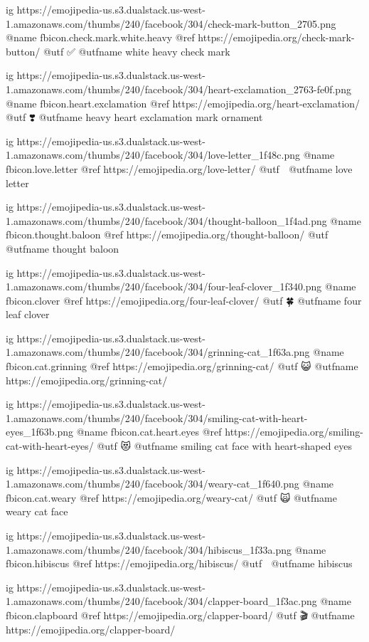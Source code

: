   ig https://emojipedia-us.s3.dualstack.us-west-1.amazonaws.com/thumbs/240/facebook/304/check-mark-button_2705.png
  @name fbicon.check.mark.white.heavy
  @ref https://emojipedia.org/check-mark-button/
  @utf ✅
  @utfname white heavy check mark

  ig https://emojipedia-us.s3.dualstack.us-west-1.amazonaws.com/thumbs/240/facebook/304/heart-exclamation_2763-fe0f.png
  @name fbicon.heart.exclamation
  @ref https://emojipedia.org/heart-exclamation/
  @utf ❣️
  @utfname heavy heart exclamation mark ornament

  ig https://emojipedia-us.s3.dualstack.us-west-1.amazonaws.com/thumbs/240/facebook/304/love-letter_1f48c.png
  @name fbicon.love.letter
  @ref https://emojipedia.org/love-letter/
  @utf 💌
  @utfname love letter

  ig https://emojipedia-us.s3.dualstack.us-west-1.amazonaws.com/thumbs/240/facebook/304/thought-balloon_1f4ad.png
  @name fbicon.thought.baloon
  @ref https://emojipedia.org/thought-balloon/
  @utf 💭
  @utfname thought baloon

  ig https://emojipedia-us.s3.dualstack.us-west-1.amazonaws.com/thumbs/240/facebook/304/four-leaf-clover_1f340.png
  @name fbicon.clover
  @ref https://emojipedia.org/four-leaf-clover/
  @utf 🍀
  @utfname four leaf clover

  ig https://emojipedia-us.s3.dualstack.us-west-1.amazonaws.com/thumbs/240/facebook/304/grinning-cat_1f63a.png
  @name fbicon.cat.grinning
  @ref https://emojipedia.org/grinning-cat/
  @utf 😺
  @utfname https://emojipedia.org/grinning-cat/

  ig https://emojipedia-us.s3.dualstack.us-west-1.amazonaws.com/thumbs/240/facebook/304/smiling-cat-with-heart-eyes_1f63b.png
  @name fbicon.cat.heart.eyes
  @ref https://emojipedia.org/smiling-cat-with-heart-eyes/
  @utf 😻
  @utfname smiling cat face with heart-shaped eyes

  ig https://emojipedia-us.s3.dualstack.us-west-1.amazonaws.com/thumbs/240/facebook/304/weary-cat_1f640.png
  @name fbicon.cat.weary
  @ref https://emojipedia.org/weary-cat/
  @utf 🙀
  @utfname weary cat face

  ig https://emojipedia-us.s3.dualstack.us-west-1.amazonaws.com/thumbs/240/facebook/304/hibiscus_1f33a.png
  @name fbicon.hibiscus
  @ref https://emojipedia.org/hibiscus/
  @utf 🌺
  @utfname hibiscus

  ig https://emojipedia-us.s3.dualstack.us-west-1.amazonaws.com/thumbs/240/facebook/304/clapper-board_1f3ac.png
  @name fbicon.clapboard
  @ref https://emojipedia.org/clapper-board/
  @utf 🎬
  @utfname https://emojipedia.org/clapper-board/

